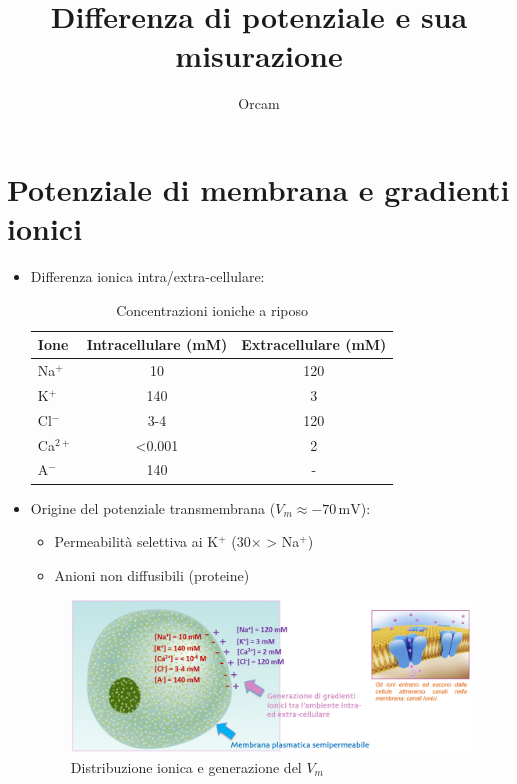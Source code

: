 \documentclass{article}
\title{Differenza di potenziale e sua misurazione}
\author{Orcam}
\date{}
\begin{document}
\maketitle

\section{Potenziale di membrana e gradienti ionici}
\begin{itemize}
\item Differenza ionica intra/extra-cellulare:
  \begin{table}[h]
  \centering
  \begin{tabular}{lcc}
  \toprule
  Ione & Intracellulare (mM) & Extracellulare (mM) \\
  \midrule
  Na\(^+\) & 10 & 120 \\
  K\(^+\) & 140 & 3 \\
  Cl\(^-\) & 3-4 & 120 \\
  Ca\(^{2+}\) & <0.001 & 2 \\
  A\(^-\) & 140 & - \\
  \bottomrule
  \end{tabular}
  \caption{Concentrazioni ioniche a riposo}
  \end{table}

\item Origine del potenziale transmembrana (\(V_m \approx -70 \, \text{mV}\)):
  \begin{itemize}
  \item Permeabilità selettiva ai K\(^+\) (30× > Na\(^+\))
  \item Anioni non diffusibili (proteine)
  \end{itemize}

\begin{figure}[h]
\centering
\includegraphics[width=1\textwidth]{Neuroscienze 2024-2025/Modulo I/Immagini Modulo I/Screenshot 2025-06-21 at 17-38-29 6. Differenza di potenziale e sua misurazione .pdf.png}
\caption{Distribuzione ionica e generazione del \(V_m\)}
\label{fig:gradienti}
\end{figure}
\end{itemize}
\end{document}
